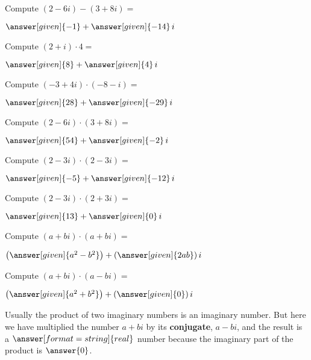\documentclass[nooutcomes]{ximera}
\begin{document}
\begin{problem}
Compute $(2-6i) - (3+8i) =$ 
\begin{prompt}
	$\answer[given]{-1} + \answer[given]{-14}\,i$
\end{prompt}
\end{problem}


\begin{problem}
Compute $(2+i) \cdot 4 =$
\begin{prompt}
	$\answer[given]{8} + \answer[given]{4}\,i$
\end{prompt}
\end{problem}



\begin{problem}
Compute $(-3 + 4i) \cdot (-8 - i) =$
\begin{prompt}
	$\answer[given]{28} + \answer[given]{-29}\,i$
\end{prompt}
\end{problem}




\begin{problem}
Compute $(2-6i) \cdot (3+8i)=$
\begin{prompt}
	$\answer[given]{54} + \answer[given]{-2}\,i$
\end{prompt}
\end{problem}

\begin{problem}
Compute $(2-3i) \cdot (2-3i)=$
\begin{prompt}
	$\answer[given]{-5} + \answer[given]{-12}\,i$
\end{prompt}
\end{problem}

\begin{problem}
Compute $(2-3i) \cdot (2+3i)=$
\begin{prompt}
	$\answer[given]{13} + \answer[given]{0}\,i$
\end{prompt}
\end{problem}

\begin{problem}
Compute $(a+bi) \cdot (a+bi)=$
\begin{prompt}
	$\left(\answer[given]{a^2-b^2}\right) + \left(\answer[given]{2ab}\right)i$
\end{prompt}
\end{problem}

\begin{problem}
Compute $(a+bi) \cdot (a-bi)=$
\begin{prompt}
	$\left(\answer[given]{a^2+b^2}\right) + \left(\answer[given]{0}\right)i$
\end{prompt}
\begin{problem}
Usually the product of two imaginary numbers is an imaginary number.  But here we have multiplied the number $a+bi$ by its
\textbf{conjugate}, $a-bi$, and the result is a $\answer[format=string]{real}$ number because the imaginary part of the product is $\answer{0}$.   
\end{problem}
\end{problem}
\end{document}
